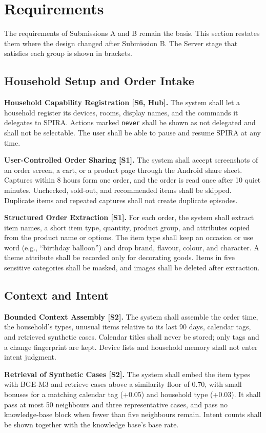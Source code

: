 \documentclass[conference]{IEEEtran}
\begin{document}
\section{Requirements}
The requirements of Submissions A and B remain the basis. This section restates them where the design changed after Submission B. The Server stage that satisfies each group is shown in brackets.

\subsection{Household Setup and Order Intake}
\textbf{Household Capability Registration [S6, Hub].} The system shall let a household register its devices, rooms, display names, and the commands it delegates to SPIRA. Actions marked \texttt{never} shall be shown as not delegated and shall not be selectable. The user shall be able to pause and resume SPIRA at any time.

\textbf{User-Controlled Order Sharing [S1].} The system shall accept screenshots of an order screen, a cart, or a product page through the Android share sheet. Captures within 8 hours form one order, and the order is read once after 10 quiet minutes. Unchecked, sold-out, and recommended items shall be skipped. Duplicate items and repeated captures shall not create duplicate episodes.

\textbf{Structured Order Extraction [S1].} For each order, the system shall extract item names, a short item type, quantity, product group, and attributes copied from the product name or options. The item type shall keep an occasion or use word (e.g., ``birthday balloon'') and drop brand, flavour, colour, and character. A theme attribute shall be recorded only for decorating goods. Items in five sensitive categories shall be masked, and images shall be deleted after extraction.

\subsection{Context and Intent}
\textbf{Bounded Context Assembly [S2].} The system shall assemble the order time, the household's types, unusual items relative to its last 90 days, calendar tags, and retrieved synthetic cases. Calendar titles shall never be stored; only tags and a change fingerprint are kept. Device lists and household memory shall not enter intent judgment.

\textbf{Retrieval of Synthetic Cases [S2].} The system shall embed the item types with BGE-M3 \cite{ref15} and retrieve cases above a similarity floor of 0.70, with small bonuses for a matching calendar tag (+0.05) and household type (+0.03). It shall pass at most 50 neighbours and three representative cases, and pass no knowledge-base block when fewer than five neighbours remain. Intent counts shall be shown together with the knowledge base's base rate.
\end{document}
